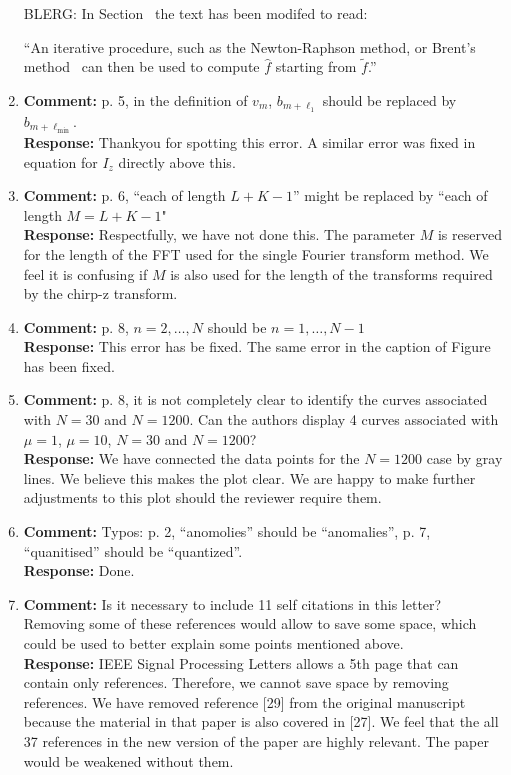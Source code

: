 \documentclass[a4paper,10pt]{article}
\begin{document}
\begin{enumerate}
BLERG: In Section~ the text has been modifed to read:

``An iterative procedure, such as the Newton-Raphson method, or Brent's method~\cite{Brent_opt_no_derivs_1973} 
can then be used to compute $\hat{f}$ starting from $\widetilde{f}$.''



\item\textbf{Comment:}
p. 5, in the definition of $v_m$, $b_{m+\ell_1}$ should be replaced by $b_{m+\ell_{\text{min}}}$.
\\
\textbf{Response:}
Thankyou for spotting this error.  A similar error was fixed in equation for $I_z$ directly above this. 


\item\textbf{Comment:}
p. 6, ``each of length $L+K-1$'' might be replaced by ``each of length $M = L + K - 1$"
\\
\textbf{Response:}
Respectfully, we have not done this.  The parameter $M$ is reserved for the length of the FFT used for the single Fourier transform method.  We feel it is confusing if $M$ is also used for the length of the transforms required by the chirp-z transform.


\item\textbf{Comment:}
p. 8, $n = 2,\dots,N$ should be $n = 1, \dots, N - 1$
\\
\textbf{Response:}
This error has be fixed.  The same error in the caption of Figure~ has been fixed.


\item\textbf{Comment:}
p. 8, it is not completely clear to identify the curves associated with $N = 30$ and $N = 1200$. Can the authors display 4 curves associated with $\mu= 1$, $\mu = 10$, $N = 30$ and $N = 1200$?
\\
\textbf{Response:}
We have connected the data points for the $N=1200$ case by gray lines.  We believe this makes the plot clear.  We are happy to make further adjustments to this plot should the reviewer require them. 

\item\textbf{Comment:}
Typos: p. 2, ``anomolies'' should be ``anomalies'', p. 7, ``quanitised'' should be
``quantized''.
\\
\textbf{Response:}
Done.


\item\textbf{Comment:} 
Is it necessary to include 11 self citations in this letter? Removing some of
these references would allow to save some space, which could be used to better
explain some points mentioned above.
\\
\textbf{Response:}
IEEE Signal Processing Letters allows a 5th page that can contain only references.  Therefore, we cannot save space by removing references.   We have removed reference [29] from the original manuscript because the material in that paper is also covered in [27].  We feel that the all 37 references in the new version of the paper are highly relevant.  The paper would be weakened without them.

\end{enumerate}
\end{document}

